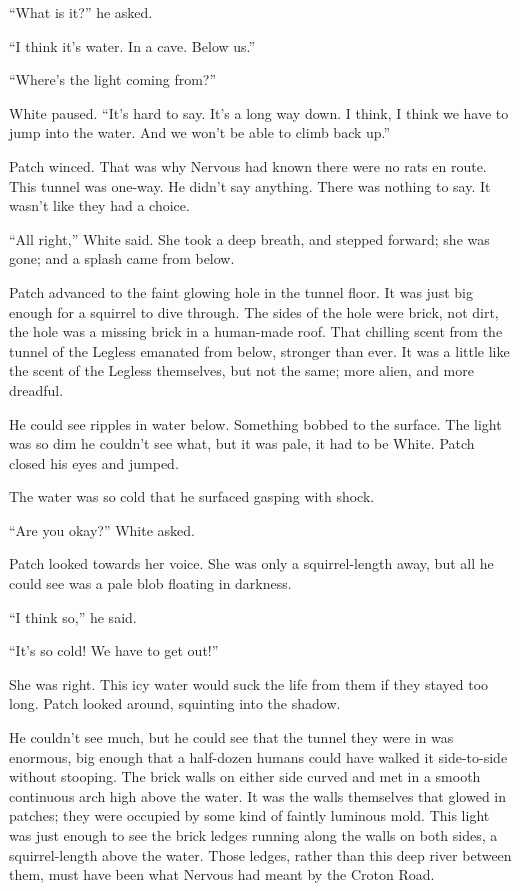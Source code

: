 \documentclass[ebook,oneside,openany,17pt]{memoir}
\newenvironment{tolerant}[1]{%
  \par\tolerance=#1\relax
}{%
  \par
}
\begin{document}
“What is it?” he asked.

“I think it’s water. In a cave. Below us.”

“Where’s the light coming from?”

White paused. “It’s hard to say. It’s a long way down. I think, I
think we have to jump into the water. And we won’t be able to climb
back up.”

Patch winced. That was why Nervous had known there were no rats en
route. This tunnel was one-way. He didn’t say anything. There was
nothing to say. It wasn’t like they had a choice.

“All right,” White said. She took a deep breath, and stepped forward;
she was gone; and a splash came from below.

Patch advanced to the faint glowing hole in the tunnel floor. It was
just big enough for a squirrel to dive through. The sides of the hole
were brick, not dirt, the hole was a missing brick in a human-made
roof. That chilling scent from the tunnel of the Legless emanated from
below, stronger than ever. It was a little like the scent of the
Legless themselves, but not the same; more alien, and more dreadful.

\begin{tolerant}{1000}
He could see ripples in water below. Something bobbed to the
surface. The light was so dim he couldn’t see what, but it was pale,
it had to be White. Patch closed his eyes and jumped.
\end{tolerant}

The water was so cold that he surfaced gasping with shock.

“Are you okay?” White asked.

Patch looked towards her voice. She was only a squirrel-length away,
but all he could see was a pale blob floating in darkness.

“I think so,” he said.

“It’s so cold! We have to get out!”

\begin{tolerant}{2000}
She was right. This icy water would suck the life from them if they
stayed too long. Patch looked around, squinting into the shadow.
\end{tolerant}

He couldn’t see much, but he could see that the tunnel they were in
was enormous, big enough that a half-dozen humans could have walked it
side-to-side without stooping. The brick walls on either side curved
and met in a smooth continuous arch high above the water. It was the
walls themselves that glowed in patches; they were occupied by some
kind of faintly luminous mold. This light was just enough to see the
brick ledges running along the walls on both sides, a squirrel-length
above the water. Those ledges, rather than this deep river between
them, must have been what Nervous had meant by the Croton Road.
\end{document}
